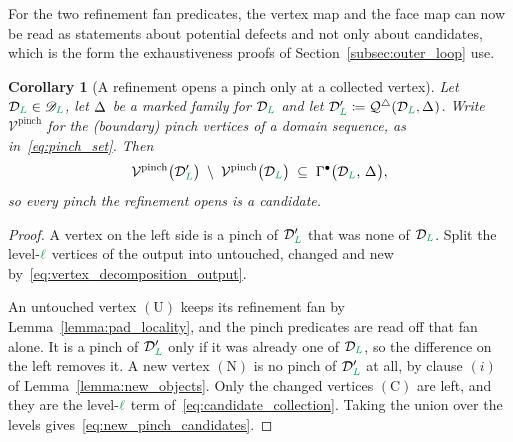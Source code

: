 \documentclass[a4paper, 12pt]{article}
\makeatletter
\newcommand{\quadriF}{\mathcal{Q}^{\triangle}}                   %
\newcommand{\collectV}{\Gamma^{\bullet}}                         %
\newcommand{\green}{\color{ForestGreen}}
\newcommand{\V}{\mathcal{V}}
\DeclareRobustCommand{\simplexsubsetTwo}[2][]{\Delta\ifx\@empty#1\@empty\else^{#1}\fi_{#2}}
\renewcommand{\l}{{\green\ell}}
\renewcommand{\L}{{\green L}}
\newtheorem{corollary}[theorem]{Corollary}
\theoremstyle{definition}
\theoremstyle{plain}
\numberwithin{equation}{section}
\DeclareRobustCommand{\domseq}[1][]{\mathcal{D}\ifx\@empty#1\@empty\else_{#1}\fi}
\newcommand{\alldomseqs}{\mathscr{D}}
\makeatother
\begin{document}
For the two refinement fan predicates, the vertex map and the face map can now be read as statements about potential defects and not only about candidates, which is the form the exhaustiveness proofs of Section~\ref{subsec:outer_loop} use.

\begin{corollary}[A refinement opens a pinch only at a collected vertex]
    \label{cor:new_pinch_candidates}
    Let $\domseq[\L] \in \alldomseqs_\L$, let $\simplexsubsetTwo{}$ be a marked family for $\domseq[\L]$ and let $\domseq[\L]' \coloneq \quadriF(\domseq[\L], \simplexsubsetTwo{})$. Write $\V^{\mathrm{pinch}}$ for the (boundary) pinch vertices of a domain sequence, as in~\eqref{eq:pinch_set}. Then
    \begin{equation}
        \label{eq:new_pinch_candidates}
        \V^{\mathrm{pinch}} \big( \domseq[\L]' \big) \; \setminus \; \V^{\mathrm{pinch}} \big( \domseq[\L] \big) \; \subseteq \; \collectV \big( \domseq[\L], \, \simplexsubsetTwo{} \big) ,
    \end{equation}
    so every pinch the refinement opens is a candidate.
\end{corollary}
\begin{proof}
    A vertex on the left side is a pinch of $\domseq[\L]'$ that was none of $\domseq[\L]$. Split the level-$\l$ vertices of the output into untouched, changed and new by~\eqref{eq:vertex_decomposition_output}.

    An untouched vertex $(\mathrm{U})$ keeps its refinement fan by Lemma~\ref{lemma:pad_locality}, and the pinch predicates are read off that fan alone. It is a pinch of $\domseq[\L]'$ only if it was already one of $\domseq[\L]$, so the difference on the left removes it. A new vertex $(\mathrm{N})$ is no pinch of $\domseq[\L]'$ at all, by clause $(i)$ of Lemma~\ref{lemma:new_objects}. Only the changed vertices $(\mathrm{C})$ are left, and they are the level-$\l$ term of~\eqref{eq:candidate_collection}. Taking the union over the levels gives~\eqref{eq:new_pinch_candidates}.
\end{proof}
\end{document}

